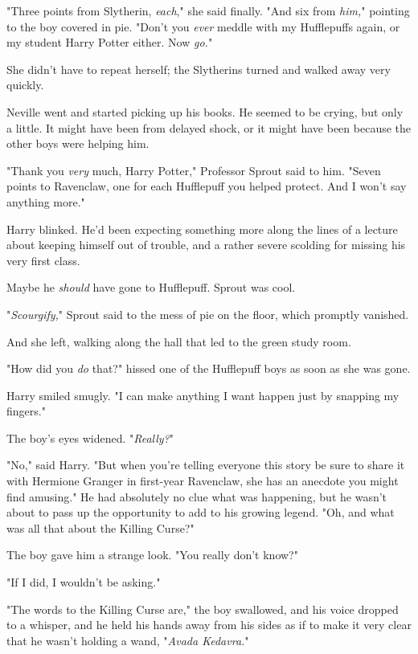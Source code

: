 "Three points from Slytherin, \emph{each}," she said finally. "And six from 
\emph{him,}" pointing to the boy covered in pie. "Don't you \emph{ever} meddle 
with my Hufflepuffs again, or my student Harry Potter either. Now \emph{go.}"

She didn't have to repeat herself; the Slytherins turned and walked away very 
quickly.

Neville went and started picking up his books. He seemed to be crying, but only 
a little. It might have been from delayed shock, or it might have been because 
the other boys were helping him.

"Thank you \emph{very} much, Harry Potter," Professor Sprout said to him. 
"Seven points to Ravenclaw, one for each Hufflepuff you helped protect. And I 
won't say anything more."

Harry blinked. He'd been expecting something more along the lines of a lecture 
about keeping himself out of trouble, and a rather severe scolding for missing 
his very first class.

Maybe he \emph{should} have gone to Hufflepuff. Sprout was cool.

"\emph{Scourgify,}" Sprout said to the mess of pie on the floor, which promptly 
vanished.

And she left, walking along the hall that led to the green study room.

"How did you \emph{do} that?" hissed one of the Hufflepuff boys as soon as she 
was gone.

Harry smiled smugly. "I can make anything I want happen just by snapping my 
fingers."

The boy's eyes widened. "\emph{Really?}"

"No," said Harry. "But when you're telling everyone this story be sure to share 
it with Hermione Granger in first-year Ravenclaw, she has an anecdote you might 
find amusing." He had absolutely no clue what was happening, but he wasn't 
about to pass up the opportunity to add to his growing legend. "Oh, and what 
was all that about the Killing Curse?"

The boy gave him a strange look. "You really don't know?"

"If I did, I wouldn't be asking."

"The words to the Killing Curse are," the boy swallowed, and his voice dropped 
to a whisper, and he held his hands away from his sides as if to make it very 
clear that he wasn't holding a wand, "\emph{Avada Kedavra.}"

